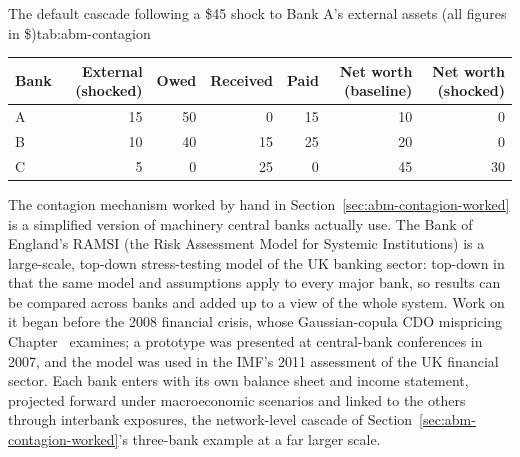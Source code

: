 \documentclass[../ai_in_finance]{subfiles}
\begin{document}
\begin{booktable}[htbp]{The default cascade following a \$45 shock to Bank A's external assets (all figures in \$)}{tab:abm-contagion}
\begin{tabular}{lrrrrrr}
\toprule
Bank & External (shocked) & Owed & Received & Paid & Net worth (baseline) & Net worth (shocked) \\
\midrule
A & 15 & 50 & 0  & 15 & 10 & 0 \\
B & 10 & 40 & 15 & 25 & 20 & 0 \\
C & 5  & 0  & 25 & 0  & 45 & 30 \\
\bottomrule
\end{tabular}
\end{booktable}


The contagion mechanism worked by hand in Section~\ref{sec:abm-contagion-worked} is a simplified version of machinery central banks actually use. The Bank of England's RAMSI (the Risk Assessment Model for Systemic Institutions) is a large-scale, top-down stress-testing model of the UK banking sector: top-down in that the same model and assumptions apply to every major bank, so results can be compared across banks and added up to a view of the whole system. Work on it began before the 2008 financial crisis, whose Gaussian-copula CDO mispricing Chapter~ examines; a prototype was presented at central-bank conferences in 2007, and the model was used in the IMF's 2011 assessment of the UK financial sector. Each bank enters with its own balance sheet and income statement, projected forward under macroeconomic scenarios and linked to the others through interbank exposures, the network-level cascade of Section~\ref{sec:abm-contagion-worked}'s three-bank example at a far larger scale.
\end{document}
